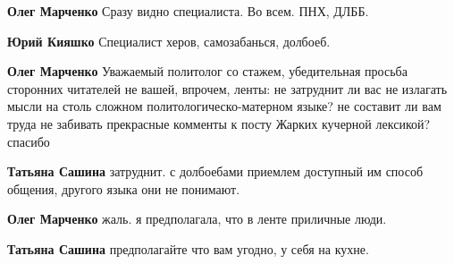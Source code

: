 \begin{itemize}
\begin{itemize}
\textbf{Олег Марченко} Сразу видно специалиста. Во всем. ПНХ, ДЛББ.

 
\textbf{Юрий Кияшко} Специалист херов, самозабанься, долбоеб.

 
\textbf{Олег Марченко} Уважаемый политолог со стажем, убедительная просьба сторонних читателей не вашей, впрочем, ленты: не затруднит ли вас не излагать мысли на столь сложном политологическо-матерном языке? не составит ли вам труда не забивать прекрасные комменты к посту Жарких кучерной лексикой? спасибо

 
\textbf{Татьяна Сашина} затруднит. с долбоебами приемлем доступный им способ общения, другого языка они не понимают.

 
\textbf{Олег Марченко} жаль. я предполагала, что в ленте приличные люди.

 
\textbf{Татьяна Сашина} предполагайте что вам угодно, у себя на кухне.

 

\end{itemize}
\end{itemize}
